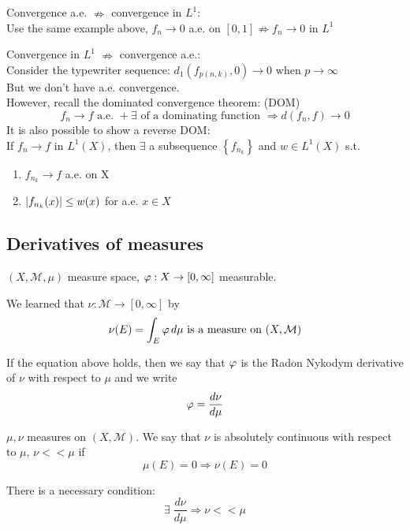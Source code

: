 Convergence a.e. \(\nRightarrow\) convergence in \(L^1\): \\
Use the same example above, \(f_n \rightarrow 0\) a.e. on \([0, 1] \nRightarrow f_n \rightarrow 0\) in \(L^1\)

Convergence in \(L^1\) \(\nRightarrow\) convergence a.e.: \\
Consider the typewriter sequence: \( d_1(f_{p(n, k)}, 0) \to 0\) when \( p \to\infty\) \\
But we don't have a.e. convergence. \\
However, recall the dominated convergence theorem: (DOM)
\[ 
    f_n \rightarrow f \text{ a.e. } + \exists \text{ of a dominating function } \Rightarrow d(f_n, f)\rightarrow 0 
\]
It is also possible to show a reverse DOM: \\
If \(f_n \to f \) in \(L^1(X)\), then \(\exists\) a subsequence \(\left\{f_{n_k}\right\}\) and \(w \in L^1(X)\) s.t. 
\begin{enumerate}
    \item \(f_{n_k} \rightarrow f\) a.e. on X
    \item \( \abs{f_{n_k}(x)} \leq w(x) \) for a.e. \(x \in X\)
\end{enumerate}

\subsection*{Derivatives of measures}
\(\left(X, \mathcal{M}, \mu \right)\) measure space,
\(\oldphi : X \to \left[0, \infty \right]\) measurable.  

We learned that \(\nu: \mathcal{M} \to \left[0, \infty \right]\) by 
\[
    \nu(E)= \int_E \oldphi \, d\mu \mbox{ is a measure on }(X, \mathcal{M})
\] 

If the equation above holds, then we say that \(\oldphi \) is the Radon Nykodym derivative of \(\nu\) with respect to \(\mu\) and we write 
\[
    \oldphi = \frac{d\nu}{d\mu}
\]
\begin{definition}
    \(\mu, \nu  \) measures on \(\left(X, \mathcal{M}\right)\). 
    We say that \(\nu\) is absolutely continuous with respect to \(\mu\), \(\nu << \mu \) if 
    \[
        \mu(E) = 0 \Rightarrow \nu(E)=0
    \]
\end{definition}

\begin{lemma}
    There is a necessary condition:
    \[ 
        \exists \; \frac{d \nu}{d \mu} \Rightarrow \nu << \mu 
    \]
\end{lemma}

